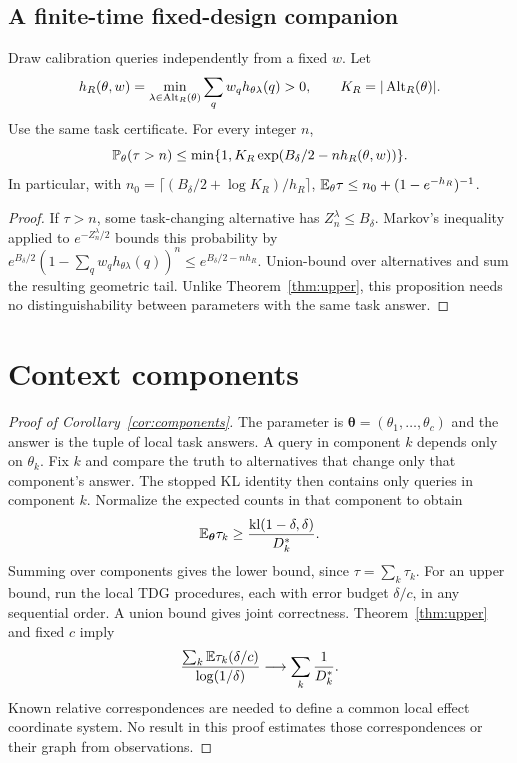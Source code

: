 \subsection{A finite-time fixed-design companion}
\begin{proposition}\label{prop:finite}
Draw calibration queries independently from a fixed $w$. Let
\begin{equation}
h_R(\theta,w)=\min_{\lambda\in\operatorname{Alt}_R(\theta)}\sum_qw_qh_{\theta\lambda}(q)>0,
\qquad K_R=|\operatorname{Alt}_R(\theta)|.
\end{equation}
Use the same task certificate. For every integer $n$,
\begin{equation}
\mathbb P_\theta(\tau>n)\le\min\{1,K_R\exp(B_\delta/2-nh_R(\theta,w))\}.
\end{equation}
In particular, with $n_0=\lceil(B_\delta/2+\log K_R)/h_R\rceil$,
$\mathbb E_\theta\tau\le n_0+(1-e^{-h_R})^{-1}$.
\end{proposition}
\begin{proof}
If $\tau>n$, some task-changing alternative has $Z_n^\lambda\le B_\delta$. Markov's inequality applied to $e^{-Z_n^\lambda/2}$ bounds this probability by $e^{B_\delta/2}(1-\sum_qw_qh_{\theta\lambda}(q))^n\le e^{B_\delta/2-nh_R}$. Union-bound over alternatives and sum the resulting geometric tail. Unlike Theorem~\ref{thm:upper}, this proposition needs no distinguishability between parameters with the same task answer.
\end{proof}

\section{Context components}\label{app:components}
\begin{proof}[Proof of Corollary~\ref{cor:components}]
The parameter is $\boldsymbol\theta=(\theta_1,\ldots,\theta_c)$ and the answer is the tuple of local task answers. A query in component $k$ depends only on $\theta_k$. Fix $k$ and compare the truth to alternatives that change only that component's answer. The stopped KL identity then contains only queries in component $k$. Normalize the expected counts in that component to obtain
\begin{equation}
\mathbb E_{\boldsymbol\theta}\tau_k\ge\frac{\operatorname{kl}(1-\delta,\delta)}{D_k^*}.
\end{equation}
Summing over components gives the lower bound, since $\tau=\sum_k\tau_k$. For an upper bound, run the local TDG procedures, each with error budget $\delta/c$, in any sequential order. A union bound gives joint correctness. Theorem~\ref{thm:upper} and fixed $c$ imply
\begin{equation}
\frac{\sum_k\mathbb E\tau_k(\delta/c)}{\log(1/\delta)}\longrightarrow\sum_k\frac1{D_k^*}.
\end{equation}
Known relative correspondences are needed to define a common local effect coordinate system. No result in this proof estimates those correspondences or their graph from observations.
\end{proof}

